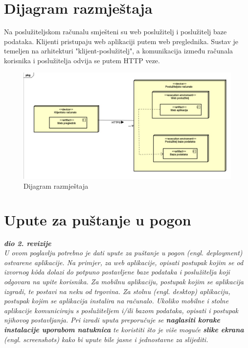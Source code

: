 		
		\section{Dijagram razmještaja}
			
			
			
			Na poslužiteljskom računalu smješteni su web poslužitelj i poslužitelj baze podataka. Klijenti pristupaju web aplikaciji putem web preglednika. Sustav je temeljen na arhitekturi "klijent-poslužitelj", a komunikacija između računala korisnika i poslužitelja odvija se putem HTTP veze.
			
			\begin{figure}[H]
				\includegraphics[width=\textwidth]{dijagram_razmjestaja.JPEG}
				\centering
				\caption{Dijagram razmještaja}
				\label{fig:dijagramrazmjestaja}
			\end{figure}
			
			\eject 
		
		\section{Upute za puštanje u pogon}
		
			\textbf{\textit{dio 2. revizije}}\\
		
			 \textit{U ovom poglavlju potrebno je dati upute za puštanje u pogon (engl. deployment) ostvarene aplikacije. Na primjer, za web aplikacije, opisati postupak kojim se od izvornog kôda dolazi do potpuno postavljene baze podataka i poslužitelja koji odgovara na upite korisnika. Za mobilnu aplikaciju, postupak kojim se aplikacija izgradi, te postavi na neku od trgovina. Za stolnu (engl. desktop) aplikaciju, postupak kojim se aplikacija instalira na računalo. Ukoliko mobilne i stolne aplikacije komuniciraju s poslužiteljem i/ili bazom podataka, opisati i postupak njihovog postavljanja. Pri izradi uputa preporučuje se \textbf{naglasiti korake instalacije uporabom natuknica} te koristiti što je više moguće \textbf{slike ekrana} (engl. screenshots) kako bi upute bile jasne i jednostavne za slijediti.}
			
